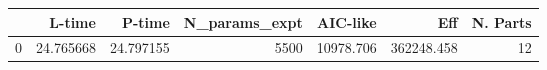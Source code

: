 \begin{tabular}{lrrrrrr}
\toprule
{} &     L-time &     P-time &  N\_params\_expt &   AIC-like &         Eff &  N. Parts \\
\midrule
0 &  24.765668 &  24.797155 &           5500 &  10978.706 &  362248.458 &        12 \\
\bottomrule
\end{tabular}
